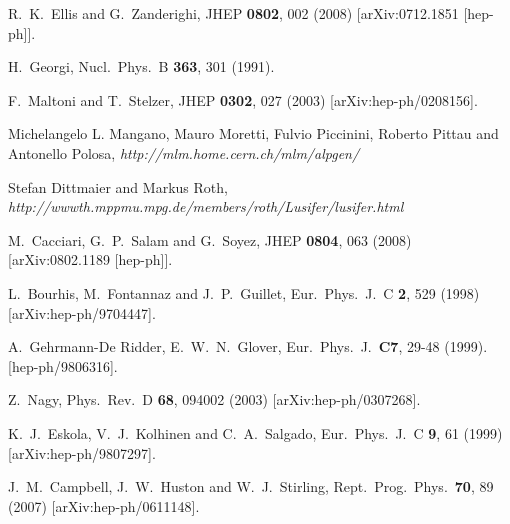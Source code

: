 \documentclass[12pt]{article}
\begin{document}
\begin{thebibliography}{99}
  R.~K.~Ellis and G.~Zanderighi,
  JHEP {\bf 0802}, 002 (2008)
  [arXiv:0712.1851 [hep-ph]].

H.~Georgi,
Nucl.\ Phys.\ B {\bf 363}, 301 (1991).

F.~Maltoni and T.~Stelzer,
JHEP {\bf 0302}, 027 (2003)
[arXiv:hep-ph/0208156].

Michelangelo L. Mangano, Mauro Moretti, Fulvio Piccinini, Roberto Pittau and Antonello Polosa, {\it http://mlm.home.cern.ch/mlm/alpgen/}

Stefan Dittmaier and Markus Roth,\\
{\it http://wwwth.mppmu.mpg.de/members/roth/Lusifer/lusifer.html}

   M.~Cacciari, G.~P.~Salam and G.~Soyez,
  JHEP {\bf 0804}, 063 (2008)
  [arXiv:0802.1189 [hep-ph]].

  L.~Bourhis, M.~Fontannaz and J.~P.~Guillet,
  Eur.\ Phys.\ J.\  C {\bf 2}, 529 (1998)
  [arXiv:hep-ph/9704447].

  A.~Gehrmann-De Ridder, E.~W.~N.~Glover,
  Eur.\ Phys.\ J.\  {\bf C7}, 29-48 (1999).
  [hep-ph/9806316].

  Z.~Nagy,
  Phys.\ Rev.\  D {\bf 68}, 094002 (2003)
  [arXiv:hep-ph/0307268].

  K.~J.~Eskola, V.~J.~Kolhinen and C.~A.~Salgado,
  Eur.\ Phys.\ J.\ C {\bf 9}, 61 (1999)
  [arXiv:hep-ph/9807297].
  
  J.~M.~Campbell, J.~W.~Huston and W.~J.~Stirling,
  Rept.\ Prog.\ Phys.\  {\bf 70}, 89 (2007)
  [arXiv:hep-ph/0611148].


\end{thebibliography}
\end{document}
